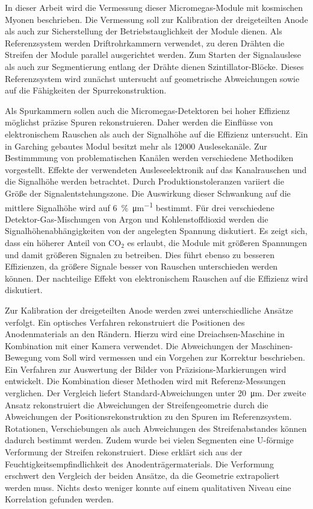 \documentclass[
twoside,            %
BCOR1.4cm,          %
10pt,               %
headings=normal,    %
headsepline,        %
clearplainpage,		%
final,              %
div=14,
open=right,
bibliography=toc
]{scrreprt}
\begin{document}
In dieser Arbeit wird die Vermessung dieser Micromegas-Module mit kosmischen Myonen beschrieben.
Die Vermessung soll zur Kalibration der dreigeteilten Anode als auch zur Sicherstellung der Betriebstauglichkeit der Module dienen.
Als Referenzsystem werden Driftrohrkammern verwendet, zu deren Dr\"ahten die Streifen der Module parallel ausgerichtet werden.
Zum Starten der Signalauslese als auch zur Segmentierung entlang der Dr\"ahte dienen Szintillator-Bl\"ocke.
Dieses Referenzsystem wird zun\"achst untersucht auf geometrische \mbox{Abweichungen} sowie auf die F\"ahigkeiten der Spurrekonstruktion.

Als Spurkammern sollen auch die Micromegas-Detektoren bei hoher Effizienz m\"oglichst pr\"azise Spuren rekonstruieren.
Daher werden die Einfl\"usse von elektronischem Rauschen als auch der Signalh\"ohe auf die Effizienz untersucht.
Ein in Garching gebautes Modul besitzt mehr als 12000 Auslesekan\"ale.
Zur Bestimmmung von problematischen Kan\"alen werden verschiedene Methodiken vorgestellt.
Effekte der verwendeten Ausleseelektronik auf das Kanalrauschen und die Signalh\"ohe werden betrachtet.
Durch Produktionstoleranzen variiert die Gr\"o\ss e der Signalentstehungszone.
Die Auswirkung dieser Schwankung auf die mittlere Signalh\"ohe wird auf \SI{6}{\%\per\micro\m} bestimmt.
F\"ur drei verschiedene Detektor-Gas-Mischungen von Argon und Kohlenstoffdioxid werden die Signalh\"ohenabh\"angigkeiten von der angelegten Spannung diskutiert.
Es zeigt sich, dass ein h\"oherer Anteil von CO$_2$ es erlaubt, die Module mit gr\"o\ss eren Spannungen und damit gr\"o\ss eren Signalen zu betreiben.
Dies f\"uhrt ebenso zu besseren Effizienzen, da gr\"o\ss ere Signale besser von Rauschen unterschieden werden k\"onnen.
Der nachteilige Effekt von elektronischem Rauschen auf die Effizienz wird diskutiert.

Zur Kalibration der dreigeteilten Anode werden zwei unterschiedliche Ans\"atze verfolgt.
Ein optisches Verfahren rekonstruiert die Positionen des Anodenmaterials an den R\"andern.
Hierzu wird eine Dreiachsen-Maschine in Kombination mit einer Kamera verwendet.
Die Abweichungen der Maschinen-Bewegung vom Soll wird vermessen und ein Vorgehen zur Korrektur beschrieben.
Ein Verfahren zur Auswertung der Bilder von Pr\"azisions-Markierungen wird entwickelt.
Die Kombination dieser Methoden wird mit Referenz-Messungen verglichen.
Der Vergleich liefert Standard-Abweichungen unter \SI{20}{\micro\m}.
Der zweite Ansatz rekonstruiert die Abweichungen der Streifengeometrie durch die Abweichungen der Positionsrekonstruktion zu den Spuren im Referenzsystem.
Rotationen, Verschiebungen als auch Abweichungen des Streifenabstandes k\"onnen dadurch bestimmt werden.
Zudem wurde bei vielen Segmenten eine U-f\"ormige Verformung der Streifen rekonstruiert.
Diese erkl\"art sich aus der Feuchtigkeitsempfindlichkeit des Anodentr\"agermaterials.
Die Verformung erschwert den Vergleich der beiden Ans\"atze, da die Geometrie extrapoliert werden muss.
Nichts desto weniger konnte auf einem qualitativen Niveau eine Korrelation gefunden werden.
\end{document}
